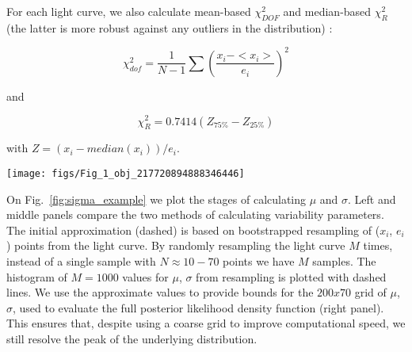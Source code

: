 \documentclass[fleqn,usenatbib]{mnras}  %
\begin{document}
For each light curve, we also calculate mean-based $\chi^{2}_{DOF}$ and median-based $\chi^{2}_{R}$ (the latter is more robust against any outliers in the distribution) : 

\begin{equation}
\label{eqn:chi2DOF}
\chi^{2}_{dof} = \frac{1}{N-1}\sum{\left( \frac{x_{i} - <x_{i}>} {e_{i}} \right) ^{2}}
\end{equation}

\noindent and
 
\begin{equation}
\label{eqn:chi2R}
\chi^{2}_{R} = 0.7414 (Z_{75\%} - Z_{25\%} ) 
\end{equation}

\noindent with $Z=(x_{i} - median(x_{i})) / e_{i} $. 
\bigskip

\begin{figure*}

\texttt{[image: figs/Fig\_1\_obj\_217720894888346446]}
\cprotect\caption{Two-step approach to finding $\mu$ and $\sigma$ via $\mu_{0}$ and $\sigma_{0}$ for an object 217720894888346446. In this calculation we use raw psf flux, before employing the faint source treatment outlined in Section~\ref{sec:analysis}. On the left and middle panels,  solid lines trace marginalized posterior pdfs for $\mu$ and $\sigma$ , while dashed lines depict histogram distributions of 10,000 bootstrap resamples for $\mu_{0}$ and $\sigma_{0}$. The right panel shows the logarithm of the posterior probability density function for $\mu$ and $\sigma$.}
\label{fig:sigma_example}
\end{figure*}

On Fig.~\ref{fig:sigma_example} we plot the stages of calculating $\mu$ and $\sigma$. Left and middle panels compare the two methods of calculating variability parameters. The initial approximation (dashed) is based on bootstrapped resampling of ($x_i$, $e_i$) points from  the light curve. By randomly resampling the light curve $M$ times, instead of a single sample with $N \approx 10-70 $ points  we have $M$ samples. The histogram of  $M=1000$ values for $\mu$, $\sigma$ from resampling is plotted with dashed lines. 
We use the approximate values to provide bounds for the $200 x 70$ grid of $\mu$, $\sigma$, used to evaluate the full posterior likelihood density function (right panel). This ensures that, despite using a coarse grid to improve computational speed,  we still resolve the peak of the underlying distribution. 
\end{document}
